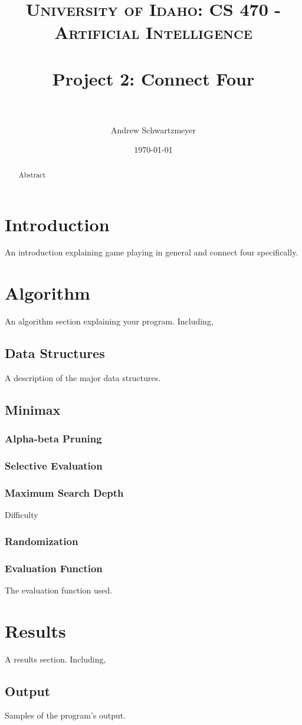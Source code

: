 \documentclass[12pt, article]{scrartcl}
\title{	
\normalfont \normalsize 
\textsc{University of Idaho: CS 470 - Artificial Intelligence} \\ [25pt]
\horrule{0.5pt} \\[0.4cm]
\huge Project 2: Connect Four\\
\horrule{2pt} \\[0.5cm]
}
\author{Andrew Schwartzmeyer}
\date{\normalsize\today}
\begin{document}
\maketitle %
\begin{abstract}
Abstract
\end{abstract}
\pagebreak
\section{Introduction}
An introduction explaining game playing in general and connect four specifically.
\section{Algorithm}
An algorithm section explaining your program. Including,
\subsection{Data Structures}
A description of the major data structures.
\subsection{Minimax}
\subsubsection{Alpha-beta Pruning}
\subsubsection{Selective Evaluation}
\subsubsection{Maximum Search Depth}
Difficulty
\subsubsection{Randomization}
\subsubsection{Evaluation Function}
The evaluation function used.
\section{Results}
A results section. Including,
\subsection{Output}
Samples of the program's output. 
\end{document}
